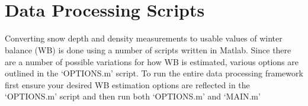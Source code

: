\documentclass{sfuthesis}
\begin{document}
\begin{appendices}
\\
\\


\chapter{Data Processing Scripts}
\label{app:DataProcessingScripts}

Converting snow depth and density measurements to usable values of winter balance (WB) is done using a number of scripts written in Matlab. Since there are a number of possible variations for how WB is estimated, various options are outlined in the `OPTIONS.m' script. To run the entire data processing framework first ensure your desired WB estimation options are reflected in the `OPTIONS.m' script and then run both `OPTIONS.m' and `MAIN.m'


\end{appendices}
\end{document}
